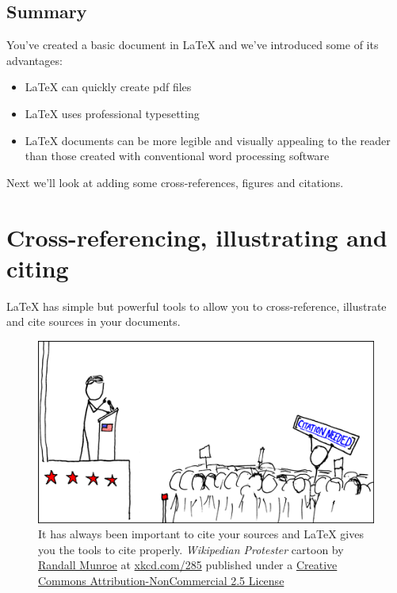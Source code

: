 \documentclass[
]{book}
\providecommand{\tightlist}{%
  \setlength{\itemsep}{0pt}\setlength{\parskip}{0pt}}
\begin{document}
\hypertarget{concsimple}{%
\section{Summary}\label{concsimple}}

You've created a basic document in LaTeX and we've introduced some of its advantages:

\begin{itemize}
\tightlist
\item
  LaTeX can quickly create pdf files
\item
  LaTeX uses professional typesetting
\item
  LaTeX documents can be more legible and visually appealing to the reader than those created with conventional word processing software
\end{itemize}

Next we'll look at adding some cross-references, figures and citations.

\hypertarget{figref}{%
\chapter{Cross-referencing, illustrating and citing}\label{figref}}

LaTeX has simple but powerful tools to allow you to cross-reference, illustrate and cite sources in your documents.

\begin{figure}

{\centering \includegraphics[width=0.7\linewidth]{images/wikipedian_protester} 

}

\caption{It has always been important to cite your sources and LaTeX gives you the tools to cite properly. \emph{Wikipedian Protester} cartoon by \href{https://en.wikipedia.org/wiki/Randall_Munroe}{Randall Munroe} at \href{https://xkcd.com/285/}{xkcd.com/285} published under a \href{https://creativecommons.org/licenses/by-nc/2.5/}{Creative Commons Attribution-NonCommercial 2.5 License}}\label{fig:wikipedian-fig}
\end{figure}
\end{document}
